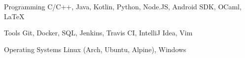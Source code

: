 

\begin{cvskills}

  \cvskill
    {Programming} %
    {C/C++, Java, Kotlin, Python, Node.JS, Android SDK, OCaml, LaTeX} %

  \cvskill
    {Tools} %
    {Git, Docker, SQL, Jenkins, Travis CI, IntelliJ Idea, Vim} %

  \cvskill
    {Operating Systems} %
    {Linux (Arch, Ubuntu, Alpine), Windows} %


\end{cvskills}
